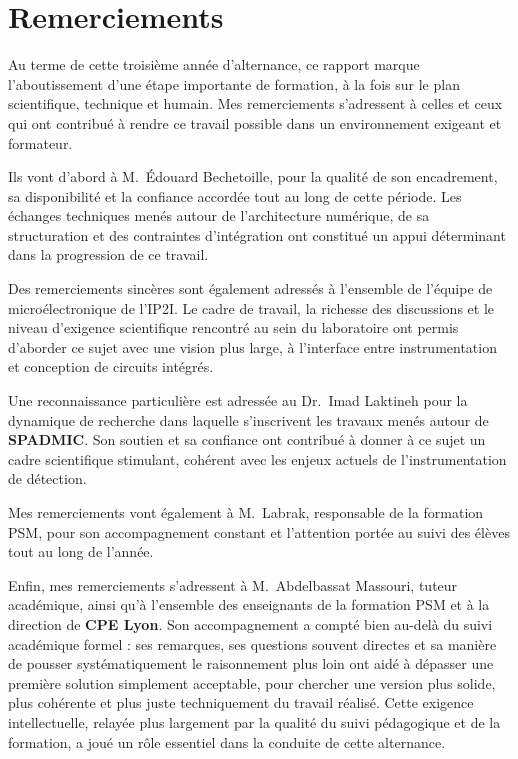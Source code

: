 \newpage
\thispagestyle{empty}
\null
\vfill
\clearpage

\chapter*{Remerciements}

\large{
Au terme de cette troisième année d’alternance, ce rapport marque l’aboutissement d’une étape importante de formation, à la fois sur le plan scientifique, technique et humain. Mes remerciements s’adressent à celles et ceux qui ont contribué à rendre ce travail possible dans un environnement exigeant et formateur.

Ils vont d’abord à M.~Édouard Bechetoille, pour la qualité de son encadrement, sa disponibilité et la confiance accordée tout au long de cette période. Les échanges techniques menés autour de l’architecture numérique, de sa structuration et des contraintes d’intégration ont constitué un appui déterminant dans la progression de ce travail.

Des remerciements sincères sont également adressés à l’ensemble de l’équipe de microélectronique de l’IP2I. Le cadre de travail, la richesse des discussions et le niveau d’exigence scientifique rencontré au sein du laboratoire ont permis d’aborder ce sujet avec une vision plus large, à l’interface entre instrumentation et conception de circuits intégrés.

Une reconnaissance particulière est adressée au Dr.~Imad Laktineh pour la dynamique de recherche dans laquelle s’inscrivent les travaux menés autour de \textbf{SPADMIC}. Son soutien et sa confiance ont contribué à donner à ce sujet un cadre scientifique stimulant, cohérent avec les enjeux actuels de l’instrumentation de détection.

Mes remerciements vont également à M.~Labrak, responsable de la formation PSM, pour son accompagnement constant et l’attention portée au suivi des élèves tout au long de l’année.

Enfin, mes remerciements s’adressent à M.~Abdelbassat Massouri, tuteur académique, ainsi qu’à l’ensemble des enseignants de la formation PSM et à la direction de \textbf{CPE Lyon}. Son accompagnement a compté bien au-delà du suivi académique formel : ses remarques, ses questions souvent directes et sa manière de pousser systématiquement le raisonnement plus loin ont aidé à dépasser une première solution simplement acceptable, pour chercher une version plus solide, plus cohérente et plus juste techniquement du travail réalisé. Cette exigence intellectuelle, relayée plus largement par la qualité du suivi pédagogique et de la formation, a joué un rôle essentiel dans la conduite de cette alternance.
}
\clearpage

\newpage
\thispagestyle{empty}
\null
\vfill
\clearpage
